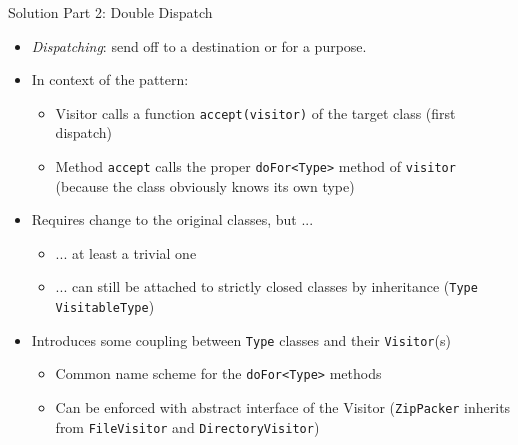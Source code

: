 \begin{frame}{Solution Part 2: Double Dispatch}
%
\begin{itemize}
\item \emph{Dispatching}: send off to a destination or for a purpose.
\item In context of the pattern:
	\begin{itemize}
	\item Visitor calls a function \texttt{accept(visitor)} of the target class (\thus first dispatch)
	\item Method \texttt{accept} calls the proper \texttt{doFor<Type>} method of \texttt{visitor} (because the class obviously knows its own type)
	\end{itemize}
\pause
\item Requires change to the original classes, but ...
	\begin{itemize}
	\item ... at least a trivial one
	\item ... can still be attached to strictly closed classes by inheritance (\texttt{Type} \thus \texttt{VisitableType})
	\end{itemize}
\item Introduces some coupling between \texttt{Type} classes and their \texttt{Visitor}(s)
	\begin{itemize}
	\item Common name scheme for the \texttt{doFor<Type>} methods
	\item Can be enforced with abstract interface of the Visitor (\texttt{ZipPacker} inherits from \texttt{FileVisitor} and \texttt{DirectoryVisitor})
	\end{itemize}
\end{itemize}
%
\end{frame}


